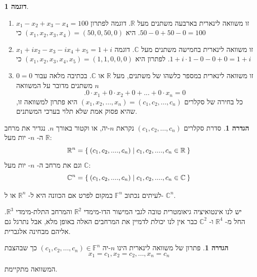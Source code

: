 \documentclass[12pt]{report}
\theoremstyle{plain}
\theoremstyle{definition}
\newtheorem{definition}[theorem]{הגדרה}
\newtheorem{example}{דוגמה}[chapter]
\newcommand{\R}{\mathbb{R}}
\newcommand{\C}{\mathbb{C}}
\newcommand{\F}{\mathbb{F}}
\newcommand{\0}{\mathbf{0}}
\begin{document}
\begin{example}\
\begin{enumerate}[label=\alph*.]
\item
$x_1-x_2+x_3-x_4=100$ זו משוואה לינארית בארבעה
משתנים מעל $\R$.
דוגמה לפתרון היא 
$(x_1,x_2,x_3,x_4)=(50,0,50,0)$
כי
$.50-0+50-0=100$

\item
$x_1+ix_2-x_3-ix_4+x_5=1+i$ זו משוואה לינארית בחמישה
משתנים מעל $\C$. דוגמה לפתרון היא 
$(x_1,x_2,x_3,x_4,x_5)=(1,1,0,0,0)$
כי
$.1+i\cdot1-0-0+0=1+i$

\item $0=0$
זו משוואה לינארית במספר כלשהו של משתנים, מעל 
$\R$
או
$\C$.
בכתיבה מלאה עבור 
$n$
משתנים
מדובר על המשוואה
$$.0\cdot x_1+0\cdot x_2+0+...+0\cdot x_n=0$$
כל בחירה של סקלרים 
$(x_1,x_2,...,x_n)=(c_1,c_2,...,c_n)$
היא פתרון למשוואה זו, שהיא פסוק אמת שלא תלוי בערכי המשתנים.
\end{enumerate}
\end{example}

\begin{definition}\label{def:F^n}
\adddeftolist{המרחבים $\R^n$ ו-$\C^n$}
סדרת סקלרים
$(c_1,c_2,...,c_n)$
נקראת
$n$-יה,
או וקטור באורך
$n$.
נגדיר את מרחב ה-
$n$-
יות מעל
$\R$:
$$
\R^{n}=\Set{(c_1,c_2,....,c_n)|c_1,c_2,....,c_n\in\R}
$$
 וגם את מרחב ה-
 $n$-
 יות מעל
 $\C$:
$$
\C^{n}=\Set{(c_1,c_2,....,c_n)|c_1,c_2,....,c_n\in\C}
$$

לעיתים נכתוב
$\F^n$
במקום לפרט אם הכוונה היא ל-
$\R^n$
או ל-
$\C^n$.
\end{definition}

יש לנו אינטואיציה גיאומטרית טובה לגבי המישור הדו-מימדי $\R^2$
והמרחב התלת-מימדי $\R^3$. החל מ-
$\R^4$
ו-
$\C^2$
כבר אין לנו יכולת לדמיין את המרחבים האלה באופן
מלא, אבל נתרגל גם אליהם מבחינה אלגברית.

\begin{definition}
פתרון של משוואה לינארית הינו $n$-יה $(c_1,c_2,...,c_n)\in\F^{n}$
כך שבהצבת
$$
x_1=c_1,x_2=c_2,...,x_n=c_n
$$

המשוואה מתקיימת.
\end{definition}
\end{document}
